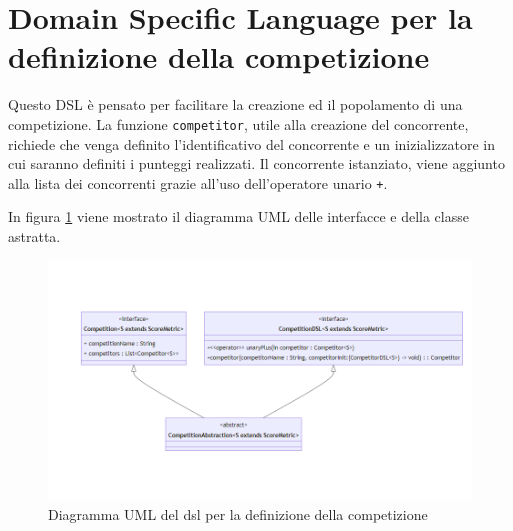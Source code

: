 \documentclass[12pt,a4paper,openright,twoside]{book}
\begin{document}
\section{Domain Specific Language per la definizione della competizione}
\label{dslcompetizione}
Questo DSL è pensato per facilitare la creazione ed il popolamento di una competizione.
La funzione \texttt{competitor}, utile alla creazione del concorrente,
richiede che venga definito l'identificativo del concorrente e un inizializzatore in cui saranno definiti i punteggi realizzati.
Il concorrente istanziato, viene aggiunto alla lista dei concorrenti grazie all'uso dell'operatore unario \texttt{+}.

In figura \ref{fig:competitionDSL} viene mostrato il diagramma UML delle interfacce e della classe astratta.
\begin{figure}[H]
    \centering
     \includegraphics[width=1.1\linewidth]{figures/competitionDSL.png}
     \caption{Diagramma UML del \ac{dsl} per la definizione della competizione}
    \label{fig:competitionDSL}
 \end{figure}
 \newpage
\end{document}
